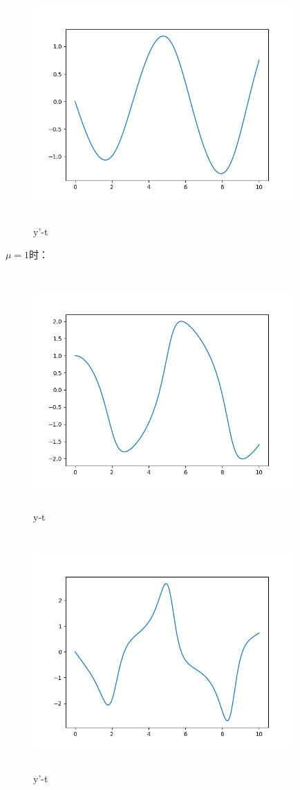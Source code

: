 \documentclass[UTF8]{ctexart}
\begin{document}
\begin{figure}[H]
 \centering
  \includegraphics[width=10cm,height=9cm]{6-01-02.png}
  \caption{y'-t}
\end{figure}


$ \mu =1 $时：

\begin{figure}[H]
 \centering
  \includegraphics[width=10cm,height=9cm]{6-1-01.png}
  \caption{y-t}
\end{figure}

\begin{figure}[H]
 \centering
  \includegraphics[width=10cm,height=9cm]{6-1-02.png}
  \caption{y'-t}
\end{figure}
\end{document}
